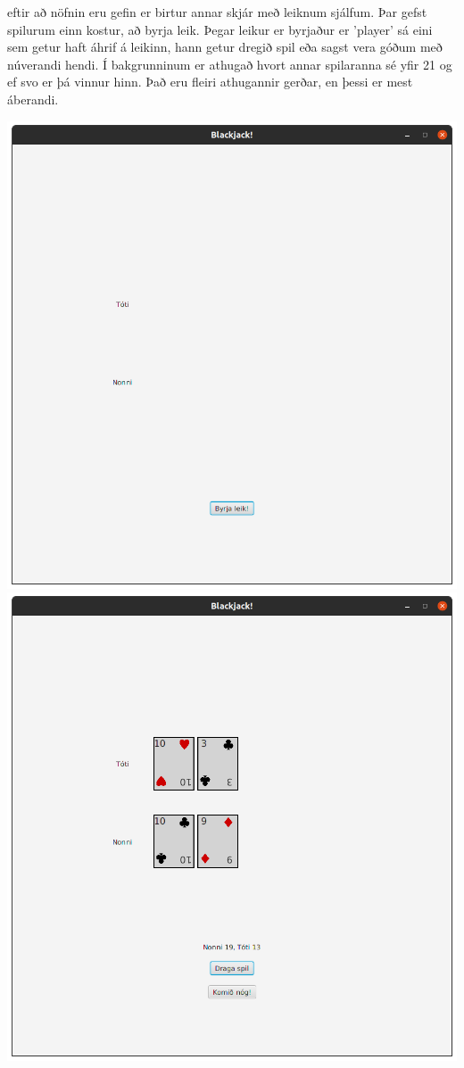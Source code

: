 \documentclass{article}
\begin{document}
eftir að nöfnin eru gefin er birtur annar skjár með leiknum sjálfum. Þar gefst spilurum einn kostur, að byrja leik.
Þegar leikur er byrjaður er 'player' sá eini sem getur haft áhrif á leikinn, hann getur dregið spil eða sagst vera góðum með núverandi hendi. 
Í bakgrunninum er athugað hvort annar spilaranna sé yfir 21 og ef svo er þá vinnur hinn. Það eru fleiri athugannir gerðar, en þessi er mest áberandi.
\begin{center}
    \includegraphics[scale=0.17]{bj1.png}
    \includegraphics[scale=0.17]{bj2.png}

\end{center}
\end{document}
